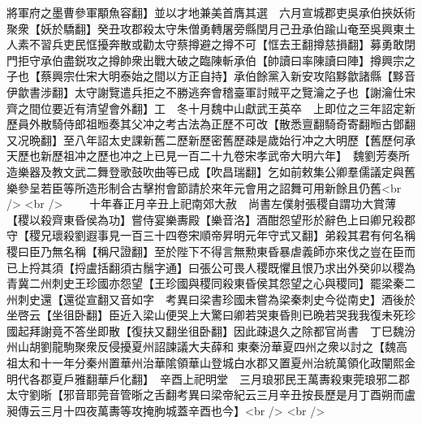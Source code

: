 將軍府之墨曹參軍顒魚容翻】並以才地兼美首膺其選　六月宣城郡吏吳承伯挾妖術聚衆【妖於驕翻】癸丑攻郡殺太守朱僧勇轉屠旁縣閏月己丑承伯踰山奄至吳興東土人素不習兵吏民恇擾奔散或勸太守蔡撙避之撙不可【恇去王翻撙慈損翻】募勇敢閉門拒守承伯盡鋭攻之撙帥衆出戰大破之臨陳斬承伯【帥讀曰率陳讀曰陣】撙興宗之子也【蔡興宗仕宋大明泰始之間以方正自持】承伯餘黨入新安攻陷黟歙諸縣【黟音伊歙書涉翻】太守謝覽遣兵拒之不勝逃奔會稽臺軍討賊平之覽瀹之子也【謝瀹仕宋齊之間位要近有清望會外翻】工　冬十月魏中山獻武王英卒　上即位之三年詔定新歷員外散騎侍郎祖暅奏其父冲之考古法為正歷不可改【散悉亶翻騎奇寄翻暅古鄧翻又况晩翻】至八年詔太史課新舊二歷新歷密舊歷疎是歲始行冲之大明歷【舊歷何承天歷也新歷祖冲之歷也冲之上已見一百二十九卷宋孝武帝大明六年】　魏劉芳奏所造樂器及教文武二舞登歌鼓吹曲等已成【吹昌瑞翻】乞如前敕集公卿羣儒議定與舊樂參呈若臣等所造形制合古擊拊會節請於來年元會用之詔舞可用新餘且仍舊<br />
<br />
　　十年春正月辛丑上祀南郊大赦　尚書左僕射張稷自謂功大賞薄【稷以殺齊東昏侯為功】嘗侍宴樂夀殿【樂音洛】酒酣怨望形於辭色上曰卿兄殺郡守【稷兄瓌殺劉遐事見一百三十四卷宋順帝昇明元年守式又翻】弟殺其君有何名稱稷曰臣乃無名稱【稱尺證翻】至於陛下不得言無勲東昏暴虐義師亦來伐之豈在臣而已上捋其須【捋盧括翻須古鬚字通】曰張公可畏人稷既懼且恨乃求出外癸卯以稷為青冀二州刺史王珍國亦怨望【王珍國與稷同殺東昏侯其怨望之心與稷同】罷梁秦二州刺史還【還從宣翻又音如字　考異曰梁書珍國未嘗為梁秦刺史今從南史】酒後於坐啓云【坐徂卧翻】臣近入梁山便哭上大驚曰卿若哭東昏則已晩若哭我我復未死珍國起拜謝竟不答坐即散【復扶又翻坐徂卧翻】因此疎退久之除都官尚書　丁巳魏汾州山胡劉龍駒聚衆反侵擾夏州詔諫議大夫薛和東秦汾華夏四州之衆以討之【魏高祖太和十一年分秦州置華州治華隂領華山登城白水郡又置夏州治統萬領化政闡熙金明代各郡夏戶雅翻華戶化翻】　辛酉上祀明堂　三月琅邪民王萬夀殺東莞琅邪二郡太守劉晣【邪音耶莞音管晣之舌翻考異曰梁帝紀云三月辛丑按長歷是月丁酉朔而盧昶傳云三月十四夜萬夀等攻掩朐城蓋辛酉也今】<br />
<br />
